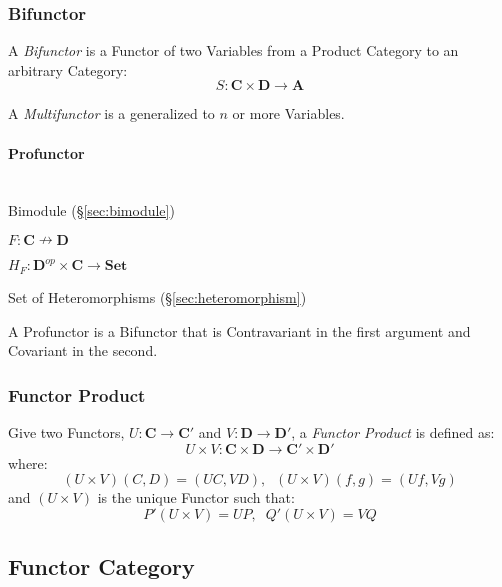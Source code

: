 \subsubsection{Bifunctor}\label{sec:bifunctor}

A \emph{Bifunctor} is a Functor of two Variables from a Product
Category to an arbitrary Category:
\[
  S : \mathbf{C} \times \mathbf{D} \rightarrow \mathbf{A}
\]

A \emph{Multifunctor} is a generalized to $n$ or more Variables.



\paragraph{Profunctor}\label{sec:profunctor}
\hfill \\

Bimodule (\S\ref{sec:bimodule})

$F : \mathbf{C} \nrightarrow \mathbf{D}$

$H_F : \mathbf{D}^{op} \times \mathbf{C} \rightarrow \mathbf{Set}$

Set of Heteromorphisms (\S\ref{sec:heteromorphism})

A Profunctor is a Bifunctor that is Contravariant in the first
argument and Covariant in the second.



\subsubsection{Functor Product}\label{sec:functor_product}

Give two Functors, $U : \mathbf{C} \rightarrow \mathbf{C'}$ and $V :
\mathbf{D} \rightarrow \mathbf{D'}$, a \emph{Functor Product} is
defined as:
\[
  U \times V : \mathbf{C} \times \mathbf{D}
  \rightarrow \mathbf{C'} \times \mathbf{D'}
\]
where:
\[
  (U \times V)(C,D) = (UC,VD), \;\; (U \times V)(f,g) = (Uf,Vg)
\]
and $(U \times V)$ is the unique Functor such that:
\[
  P'(U \times V) = UP, \;\; Q'(U \times V) = VQ
\]



\subsection{Functor Category}\label{sec:functor_category}

